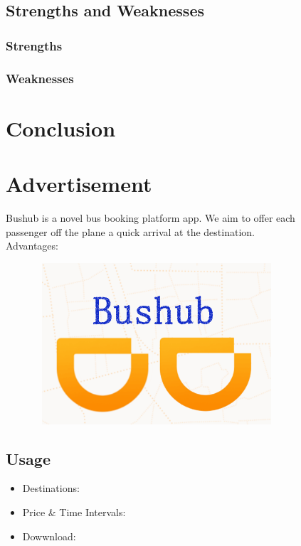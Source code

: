 \documentclass{mcmthesis}
\begin{document}
\begin{figure}[htbp]
\subsection{Strengths and Weaknesses}
\subsubsection{Strengths}
\subsubsection{Weaknesses}

\section{Conclusion}

\newpage
\section{Advertisement}
Bushub is a novel bus booking platform app. We aim to offer each passenger off the plane a quick arrival at the destination. \\
Advantages:

\begin{figure}[htbp]
    \centering
    \includegraphics[height=6cm,width=10cm]{figures/Bushublogo.png}
\end{figure}

\subsection{Usage}
\begin{itemize}
\item Destinations:
\item Price \& Time Intervals:
\item Dowwnload:
\end{itemize}


\end{figure}
\end{document}
